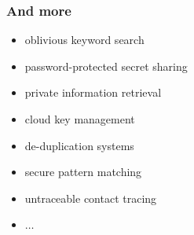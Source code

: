 \documentclass[aspectratio=169, 12pt,handout]{beamer}
\begin{document}
\begin{frame}
  \frametitle{And more~\cite{EUROSP:CasHesLeh22}}
  \begin{itemize}
    \item 
      oblivious keyword search
    \item password-protected secret sharing 
    \item private information retrieval
    \item cloud key
      management
    \item de-duplication systems 
    \item secure pattern matching 
    \item untraceable contact tracing
    \item $\ldots$
  \end{itemize}
\end{frame}
% 
\end{document}
